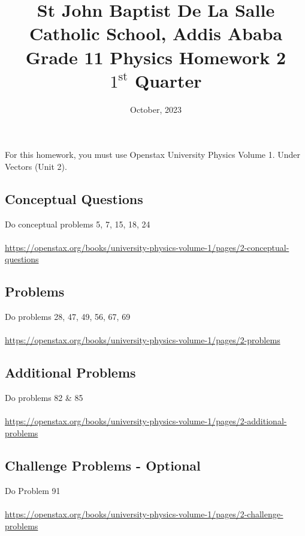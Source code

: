 \documentclass[12pt,addpoints]{exam}
\date{October, 2023}
\begin{document}
	\title{St John Baptist De La Salle Catholic School, Addis Ababa\\
		\large Grade 11 Physics Homework 2\\
		$1^\text{st}$ Quarter}
	\maketitle
		For this homework, you must use Openstax University Physics Volume 1. Under Vectors (Unit 2). \subsection*{Conceptual Questions}
		Do conceptual problems 5, 7, 15, 18, 24
		\\ \\
		\href{https://openstax.org/books/university-physics-volume-1/pages/2-conceptual-questions}{https://openstax.org/books/university-physics-volume-1/pages/2-conceptual-questions}	
		\subsection*{Problems}
		Do problems 28, 47, 49, 56, 67, 69
		\\ \\
		\href{https://openstax.org/books/university-physics-volume-1/pages/2-problems}{https://openstax.org/books/university-physics-volume-1/pages/2-problems} 
		\subsection*{Additional Problems}
		Do problems 82 \& 85
		\\ \\
		\href{https://openstax.org/books/university-physics-volume-1/pages/2-additional-problems}{https://openstax.org/books/university-physics-volume-1/pages/2-additional-problems}
		\subsection*{Challenge Problems - Optional} 
		Do Problem 91
		\\ \\
		\href{https://openstax.org/books/university-physics-volume-1/pages/2-challenge-problems}{https://openstax.org/books/university-physics-volume-1/pages/2-challenge-problems}
		
\end{document}

